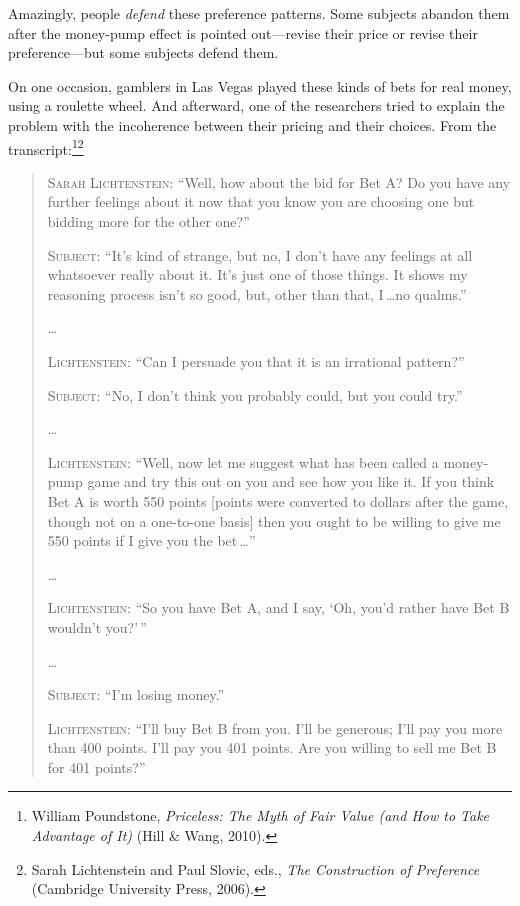  Amazingly, people \textit{defend} these preference patterns. Some
subjects abandon them after the money-pump effect is pointed
out---revise their price or revise their preference---but some subjects
defend them.

{
 On one occasion, gamblers in Las Vegas played these kinds of bets
for real money, using a roulette wheel. And afterward, one of the
researchers tried to explain the problem with the incoherence between
their pricing and their choices. From the
transcript:\footnote{William Poundstone, \textit{Priceless: The Myth of Fair Value
(and How to Take Advantage of It)} (Hill \& Wang, 2010).}\supercomma\footnote{Sarah Lichtenstein and Paul Slovic, eds., \textit{The
Construction of Preference} (Cambridge University Press, 2006).}}

\begin{quotation}

 \textsc{Sarah Lichtenstein}: ``Well, how about the bid for
Bet A? Do you have any further feelings about it now that you know you
are choosing one but bidding more for the other
one?''


 \textsc{Subject}: ``It's kind of strange,
but no, I don't have any feelings at all whatsoever
really about it. It's just one of those things. It
shows my reasoning process isn't so good, but, other
than that, I\,\ldots no qualms.''


 \ldots


 \textsc{Lichtenstein}: ``Can I persuade you that it is an
irrational pattern?''


 \textsc{Subject}: ``No, I don't think you
probably could, but you could try.''


 \ldots


 \textsc{Lichtenstein}: ``Well, now let me suggest what has
been called a money-pump game and try this out on you and see how you
like it. If you think Bet A is worth 550 points [points were converted
to dollars after the game, though not on a one-to-one basis] then you
ought to be willing to give me 550 points if I give you the bet\,\ldots''


 \textit{\ldots}


 \textsc{Lichtenstein}: ``So you have Bet A, and I say,
`Oh, you'd rather have Bet B
wouldn't you?'\,''


 \ldots


 \textsc{Subject}: ``I'm losing
money.''


 \textsc{Lichtenstein}: ``I'll buy Bet B
from you. I'll be generous; I'll pay
you more than 400 points. I'll pay you 401 points. Are
you willing to sell me Bet B for 401 points?''



\end{quotation}
